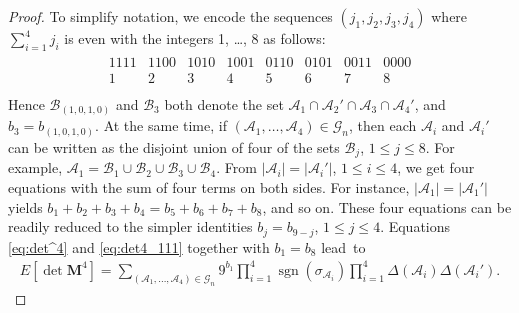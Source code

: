 \documentclass[pdftex]{sigma}
\numberwithin{equation}{section}
\theoremstyle{definition}
\newcommand{\cB}{\mathcal{B}}
\newcommand{\sgn}{\operatorname{sgn}}
\newcommand{\cA}{\mathcal{A}}
\newcommand{\cG}{\mathcal{G}}
\newcommand{\mbf}[1]{\mathbf{#1}}
\begin{document}
\begin{proof}
To simplify notation, we encode the sequences $(j_1,j_2,j_3,j_4)$ where $\sum_{i=1}^4 j_i$ is even with the integers 1, \dots, 8 as follows:
\begin{align}
\label{setlist}
 \begin{array}{c|c|c|c|c|c|c|c}
 1111 & 1100 & 1010 & 1001 & 0110 & 0101 & 0011 & 0000\\ \hline
 1 & 2 & 3 & 4 & 5 & 6 & 7 & 8\\
 \end{array}
\end{align}
Hence $\cB_{(1,0,1,0)}$ and $\cB_3$ both denote the set $\cA_1 \cap\cA_2' \cap\cA_3 \cap\cA_4'$, and $b_3=b_{(1,0,1,0)}$. At the same time,
if $(\cA_1,\dots, \cA_4)\in \cG_n$, then each $\cA_i$ and $\cA_i'$ can be written as the disjoint union of four of the sets $\cB_j$, $1\le j\le 8$. For example, $\cA_1=\cB_1\cup \cB_2\cup \cB_3\cup \cB_4$.
From $|\cA_i|=|\cA_i'|$, $1\le i\le 4$, we get four equations with the sum of four terms on both sides. For instance, $|\cA_1|=|\cA_1'|$ yields
$
b_1+b_2+b_3+b_4=b_5+b_6+b_7+b_8$,
and so on.
These four equations can be readily reduced to the simpler identities
$
 b_j=b_{9-j}$, $ 1\le j\le 4$.
Equations \eqref{eq:det^4} and \eqref{eq:det4_111} together with $b_1=b_8$ lead~to
\begin{align}\label{eq:det_4_2}
 E\left[ \det \mbf{M}^4\right]=\sum_{(\cA_1,\dots,\cA_4)\in \cG_n} 9^{ b_1}
 \prod_{i=1}^4 \sgn(\sigma_{\cA_i})
 \prod_{i=1}^4 \Delta(\cA_i)\Delta(\cA_i').
\end{align}


\end{proof}
\end{document}

